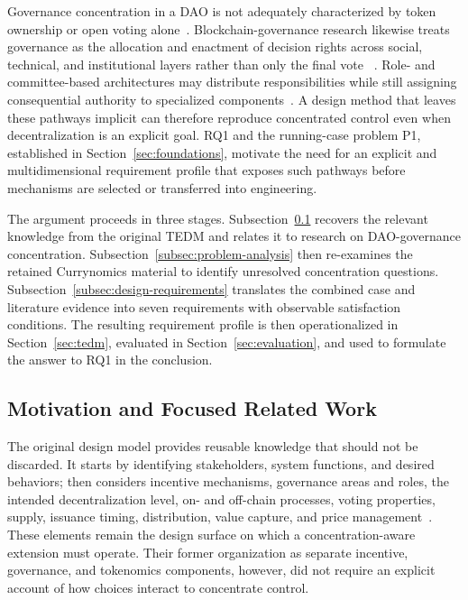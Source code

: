 \documentclass[referee,sn-basic]{sn-jnl}
\begin{document}
Governance concentration in a DAO is not adequately characterized by token
ownership or open voting alone~\cite{Fritsch2024VotingPower,Eisermann2025Concentration,
Kitzler2025Governance}. Blockchain-governance research likewise treats
governance as the allocation and enactment of decision rights across social,
technical, and institutional layers rather than only the final vote
~\cite{vanPelt2021}. Role- and committee-based architectures may distribute
responsibilities while still assigning consequential authority to specialized
components~\cite{Jungnickel2026ModularDAO}. A design method
that leaves these pathways implicit can therefore reproduce concentrated
control even when decentralization is an explicit goal. RQ1 and the
running-case problem P1, established in Section~\ref{sec:foundations}, motivate
the need for an explicit and multidimensional requirement profile that exposes
such pathways before mechanisms are selected or transferred into engineering.

The argument proceeds in three stages. Subsection~\ref{subsec:req-motivation}
recovers the relevant knowledge from the original TEDM and relates it to
research on DAO-governance concentration. Subsection~\ref{subsec:problem-analysis}
then re-examines the retained Currynomics material to identify unresolved
concentration questions. Subsection~\ref{subsec:design-requirements} translates
the combined case and literature evidence into seven requirements with
observable satisfaction conditions. The resulting requirement profile is then
operationalized in Section~\ref{sec:tedm}, evaluated in
Section~\ref{sec:evaluation}, and used to formulate the answer to RQ1 in the
conclusion.

\subsection{Motivation and Focused Related Work}\label{subsec:req-motivation}

The original design model provides reusable knowledge that should not be
discarded. It starts by identifying stakeholders, system functions, and desired
behaviors; then considers incentive mechanisms, governance areas and roles,
the intended decentralization level, on- and off-chain processes, voting
properties, supply, issuance timing, distribution, value capture, and price
management~\cite{Kivilo2023TokenEconomy}. These elements remain the design
surface on which a concentration-aware extension must operate. Their former
organization as separate incentive, governance, and tokenomics components,
however, did not require an explicit account of how choices interact to
concentrate control.
\end{document}
